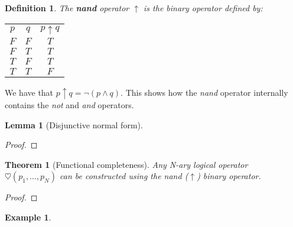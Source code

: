 \documentclass[12pt]{article}
\newtheorem{definition}{Definition}[section]
\newtheorem{theorem}{Theorem}[section]
\newtheorem{lemma}{Lemma}[section]
\newtheorem{example}{Example}[section]
\begin{document}
\begin{definition}
The \textbf{nand} operator $\uparrow$ is the binary operator defined by:

\begin{center}
\begin{tabular}{|c|c||c|}
\hline
$p$ & $q$ & $p \uparrow q$ \\
\hhline{|=|=||=|}
$F$ & $F$ & $T$ \\
\hline
$F$ & $T$ & $T$ \\
\hline
$T$ & $F$ & $T$ \\
\hline
$T$ & $T$ & $F$ \\
\hline
\end{tabular}
\end{center}
\end{definition}

We have that $p \uparrow q = \lnot \left( p \land q \right)$. This shows how the \emph{nand} operator internally contains the \emph{not} and \emph{and} operators.

\begin{lemma}[Disjunctive normal form]

\end{lemma}
\begin{proof}

\end{proof}

\begin{theorem}[Functional completeness]
Any N-ary logical operator $\heartsuit \left( p_1, \dots, p_N \right)$ can be constructed using the \emph{nand} ($\uparrow$) binary operator.
\end{theorem}
\begin{proof}

\end{proof}
\begin{example}

\end{example}
\end{document}
